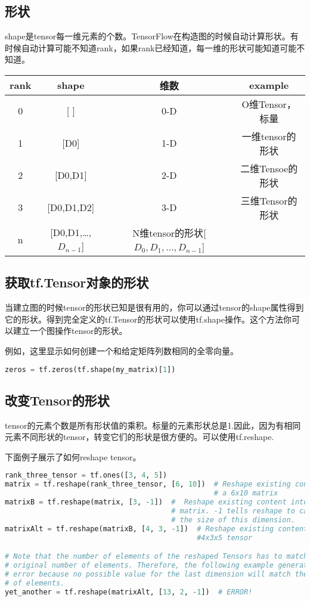 \subsection{形状}
shape是tensor每一维元素的个数。TensorFlow在构造图的时候自动计算形状。有时候自动计算可能不知道rank，如果rank已经知道，每一维的形状可能知道可能不知道。
\begin{table}[H]\label{tb:pro1}
\centering
\begin{tabular}{|c|c|c|c|}
\hline
rank&shape&维数&example\\
\hline
0&[ ]&0-D&O维Tensor，标量\\
\hline
1&[D0]&1-D&一维tensor的形状\\
\hline
2&[D0,D1]&2-D&二维Tensoe的形状\\
\hline
3&[D0,D1,D2]&3-D&三维Tensor的形状\\
\hline
n&[D0,D1,\ldots,$D_{n-1}$]&N维tensor的形状[$D_0,D_1,\ldots,D_{n-1}$]&\\
\hline
\end{tabular}
\end{table}
\subsection{获取tf.Tensor对象的形状}
当建立图的时候tensor的形状已知是很有用的，你可以通过tensor的shape属性得到它的形状。得到完全定义的tf.Tensor的形状可以使用tf.shape操作。这个方法你可以建立一个图操作tensor的形状。

例如，这里显示如何创建一个和给定矩阵列数相同的全零向量。
\begin{lstlisting}[language=Python]
zeros = tf.zeros(tf.shape(my_matrix)[1])
\end{lstlisting}
\subsection{改变Tensor的形状}
tensor的元素个数是所有形状值的乘积。标量的元素形状总是1.因此，因为有相同元素不同形状的tensor，转变它们的形状是很方便的。可以使用tf.reshape.

下面例子展示了如何reshape tensor。
\begin{lstlisting}[language=Python]
rank_three_tensor = tf.ones([3, 4, 5])
matrix = tf.reshape(rank_three_tensor, [6, 10])  # Reshape existing content into
                                                 # a 6x10 matrix
matrixB = tf.reshape(matrix, [3, -1])  #  Reshape existing content into a 3x20
                                       # matrix. -1 tells reshape to calculate
                                       # the size of this dimension.
matrixAlt = tf.reshape(matrixB, [4, 3, -1])  # Reshape existing content into a
                                             #4x3x5 tensor

# Note that the number of elements of the reshaped Tensors has to match the
# original number of elements. Therefore, the following example generates an
# error because no possible value for the last dimension will match the number
# of elements.
yet_another = tf.reshape(matrixAlt, [13, 2, -1])  # ERROR!
\end{lstlisting}
